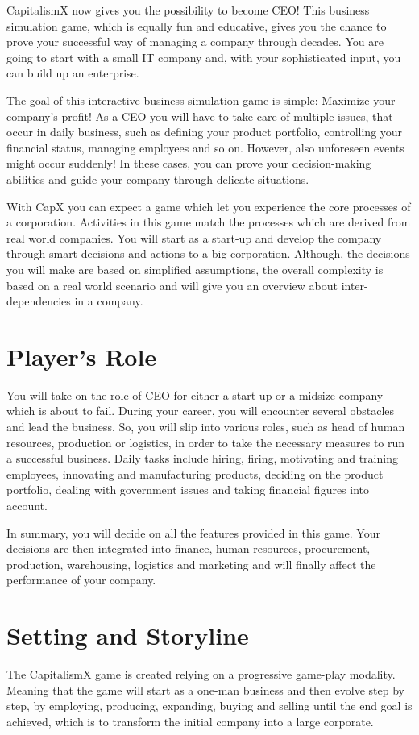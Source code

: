 \documentclass[11pt,titlepage,oneside,openany]{book}
\begin{document}
CapitalismX now gives you the possibility to become CEO! This business simulation game, which is equally fun and educative, gives you the chance to prove your successful way of managing a company through decades. You are going to start with a small IT company and, with your sophisticated input, you can build up an enterprise.

The goal of this interactive business simulation game is simple: Maximize your company's profit! As a CEO you will have to take care of multiple issues, that occur in daily business, such as defining your product portfolio, controlling your financial status, managing employees and so on. However, also unforeseen events might occur suddenly! In these cases, you can prove your decision-making abilities and guide your company through delicate situations. 

With CapX you can expect a game which let you experience the core processes of a corporation. Activities in this game match the processes which are derived from real world companies. You will start as a start-up and develop the company through smart decisions and actions to a big corporation. Although, the decisions you will make are based on simplified assumptions, the overall complexity is based on a real world scenario and will give you an overview about inter-dependencies in a company.
 
\section{Player's Role}
You will take on the role of CEO for either a start-up or a midsize company which is about to fail. During your career, you will encounter several obstacles and lead the business. So, you will slip into various roles, such as head of human resources, production or logistics, in order to take the necessary measures to run a successful business. Daily tasks include hiring, firing, motivating and training employees, innovating and manufacturing products, deciding on the product portfolio, dealing with government issues and taking financial figures into account. 

In summary, you will decide on all the features provided in this game. Your decisions are then integrated into finance, human resources, procurement, production, warehousing, logistics and marketing and will finally affect the performance of your company.

\section{Setting and Storyline}
\label{SettingStory}
The CapitalismX game is created relying on a progressive game-play modality. Meaning that the game will start as a one-man business and then evolve step by step, by employing, producing, expanding, buying and selling  until the end goal is achieved, which is to transform the initial company into a large corporate. 
\end{document}
